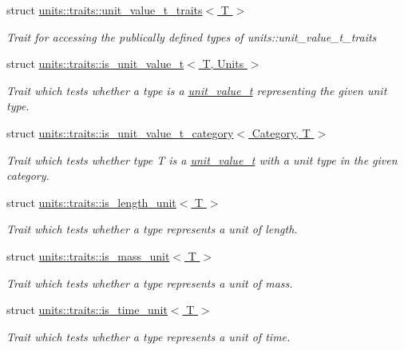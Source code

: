\begin{DoxyCompactItemize}
struct \hyperlink{structunits_1_1traits_1_1unit__value__t__traits}{units\+::traits\+::unit\+\_\+value\+\_\+t\+\_\+traits$<$ T $>$}
\begin{DoxyCompactList}\small\item\em Trait for accessing the publically defined types of {\ttfamily units\+::unit\+\_\+value\+\_\+t\+\_\+traits} \end{DoxyCompactList}\item 
struct \hyperlink{structunits_1_1traits_1_1is__unit__value__t}{units\+::traits\+::is\+\_\+unit\+\_\+value\+\_\+t$<$ T, Units $>$}
\begin{DoxyCompactList}\small\item\em Trait which tests whether a type is a \hyperlink{structunits_1_1unit__value__t}{unit\+\_\+value\+\_\+t} representing the given unit type. \end{DoxyCompactList}\item 
struct \hyperlink{structunits_1_1traits_1_1is__unit__value__t__category}{units\+::traits\+::is\+\_\+unit\+\_\+value\+\_\+t\+\_\+category$<$ Category, T $>$}
\begin{DoxyCompactList}\small\item\em Trait which tests whether type T is a \hyperlink{structunits_1_1unit__value__t}{unit\+\_\+value\+\_\+t} with a unit type in the given category. \end{DoxyCompactList}\item 
struct \hyperlink{structunits_1_1traits_1_1is__length__unit}{units\+::traits\+::is\+\_\+length\+\_\+unit$<$ T $>$}
\begin{DoxyCompactList}\small\item\em Trait which tests whether a type represents a unit of length. \end{DoxyCompactList}\item 
struct \hyperlink{structunits_1_1traits_1_1is__mass__unit}{units\+::traits\+::is\+\_\+mass\+\_\+unit$<$ T $>$}
\begin{DoxyCompactList}\small\item\em Trait which tests whether a type represents a unit of mass. \end{DoxyCompactList}\item 
struct \hyperlink{structunits_1_1traits_1_1is__time__unit}{units\+::traits\+::is\+\_\+time\+\_\+unit$<$ T $>$}
\begin{DoxyCompactList}\small\item\em Trait which tests whether a type represents a unit of time. \end{DoxyCompactList}\item 

\end{DoxyCompactItemize}
